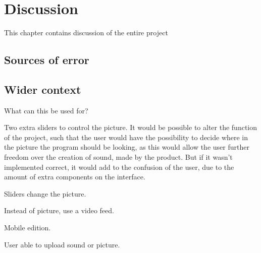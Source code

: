\chapter{Discussion}\label{ch:discussion}
This chapter contains discussion of the entire project 

\section{Sources of error}

\section{Wider context}
What can this be used for?

Two extra sliders to control the picture.
It would be possible to alter the function of the project, such that the user would have the possibility to decide where in the picture the program should be looking, as this would allow the user further freedom over the creation of sound, made by the product. But if it wasn't implemented correct, it would add to the confusion of the user, due to the amount of extra components on the interface.


Sliders change the picture. 


Instead of picture, use a video feed.


Mobile edition.


User able to upload sound or picture. 
